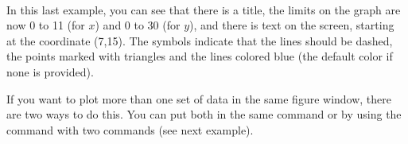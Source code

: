 \\

In this last example, you can see that there is a title, the limits on the graph are now 0 to 11 (for $x$) and 0 to 30 (for $y$), and there is text on the screen, starting at the coordinate (7,15).  The symbols {\color{myred} } indicate that the lines should be dashed, the points marked with triangles and the lines colored blue (the default color if none is provided).


If you want to plot more than one set of data in the same figure window, there are two ways to do this.  You can put both in the same  command or by using the  command with two  commands (see next example).\\

\\


